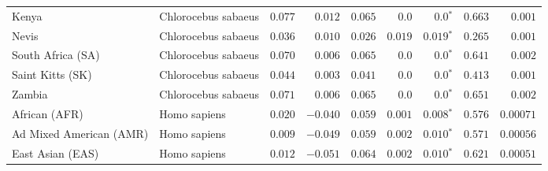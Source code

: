 \begin{center}
\begin{adjustbox}{width = 1\textwidth}
\begin{tabular}{|l|l|r|r|r|r|r|r|r|}
                          Kenya &  Chlorocebus sabaeus &                                        $ 0.077$ &                                           $ 0.012$ &                      $ 0.065$ &            $0.0$ &                  $\bm{0.0{^*}}$ &                                           $ 0.663$ &           $ 0.001$ \\
                          Nevis &  Chlorocebus sabaeus &                                        $ 0.036$ &                                           $ 0.010$ &                      $ 0.026$ &         $ 0.019$ &               $\bm{ 0.019{^*}}$ &                                           $ 0.265$ &           $ 0.001$ \\
              South Africa (SA) &  Chlorocebus sabaeus &                                        $ 0.070$ &                                           $ 0.006$ &                      $ 0.065$ &            $0.0$ &                  $\bm{0.0{^*}}$ &                                           $ 0.641$ &           $ 0.002$ \\
               Saint Kitts (SK) &  Chlorocebus sabaeus &                                        $ 0.044$ &                                           $ 0.003$ &                      $ 0.041$ &            $0.0$ &                  $\bm{0.0{^*}}$ &                                           $ 0.413$ &           $ 0.001$ \\
                         Zambia &  Chlorocebus sabaeus &                                        $ 0.071$ &                                           $ 0.006$ &                      $ 0.065$ &            $0.0$ &                  $\bm{0.0{^*}}$ &                                           $ 0.651$ &           $ 0.002$ \\
                  African (AFR) &         Homo sapiens &                                        $ 0.020$ &                                           $-0.040$ &                      $ 0.059$ &         $ 0.001$ &               $\bm{ 0.008{^*}}$ &                                           $ 0.576$ &          $0.00071$ \\
        Ad Mixed American (AMR) &         Homo sapiens &                                        $ 0.009$ &                                           $-0.049$ &                      $ 0.059$ &         $ 0.002$ &               $\bm{ 0.010{^*}}$ &                                           $ 0.571$ &          $0.00056$ \\
               East Asian (EAS) &         Homo sapiens &                                        $ 0.012$ &                                           $-0.051$ &                      $ 0.064$ &         $ 0.002$ &               $\bm{ 0.010{^*}}$ &                                           $ 0.621$ &          $0.00051$ \\

\end{tabular}
\end{adjustbox}
\end{center}
